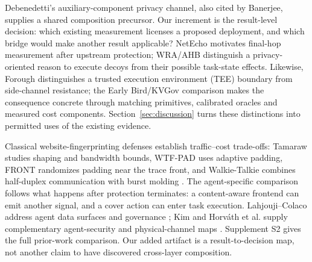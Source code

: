 Debenedetti's auxiliary-component privacy channel, also cited by Banerjee, supplies a shared composition precursor. Our increment is the result-level decision: which existing measurement licenses a proposed deployment, and which bridge would make another result applicable? NetEcho motivates final-hop measurement after upstream protection; WRA/AHB distinguish a privacy-oriented reason to execute decoys from their possible task-state effects. Likewise, Forough distinguishes a trusted execution environment (TEE) boundary from side-channel resistance; the Early Bird/KVGov comparison makes the consequence concrete through matching primitives, calibrated oracles and measured cost components. Section~\ref{sec:discussion} turns these distinctions into permitted uses of the existing evidence.

Classical website-fingerprinting defenses establish traffic--cost trade-offs: Tamaraw studies shaping and bandwidth bounds, WTF-PAD uses adaptive padding, FRONT randomizes padding near the trace front, and Walkie-Talkie combines half-duplex communication with burst molding \cite{cai2014systematic,juarez2016wtfpad,gong2020front,wang2017walkietalkie}. The agent-specific comparison follows what happens after protection terminates: a content-aware frontend can emit another signal, and a cover action can enter task execution. Lahjouji--Colaco address agent data surfaces and governance \cite{lahjouji2026datacentric}; Kim and Horv\'ath et al. supply complementary agent-security and physical-channel maps \cite{kim2026agenticsok,horvath2024physical}. Supplement S2 gives the full prior-work comparison. Our added artifact is a result-to-decision map, not another claim to have discovered cross-layer composition.
